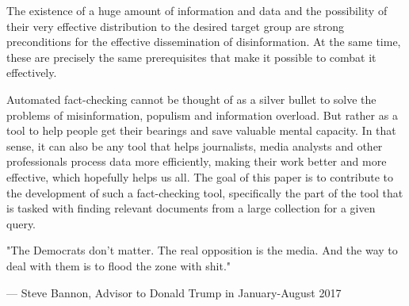 \begin{introduction}
    The existence of a huge amount of information and data and the possibility of their very effective distribution to the desired target group are strong preconditions for the effective dissemination of disinformation. At the same time, these are precisely the same prerequisites that make it possible to combat it effectively.
    
    Automated fact-checking cannot be thought of as a silver bullet to solve the problems of misinformation, populism and information overload. But rather as a tool to help people get their bearings and save valuable mental capacity. In that sense, it can also be any tool that helps journalists, media analysts and other professionals process data more efficiently, making their work better and more effective, which hopefully helps us all. The goal of this paper is to contribute to the development of such a fact-checking tool, specifically the part of the tool that is tasked with finding relevant documents from a large collection for a given query.
    
    \epigraphfontsize{\small\itshape}
    \epigraph{"The Democrats don't matter. The real opposition is the media. And the way to deal with them is to flood the zone with shit."~\parencite{illing_2020}}{--- \textup{Steve Bannon}, Advisor to Donald Trump in January-August 2017}
    

\end{introduction}